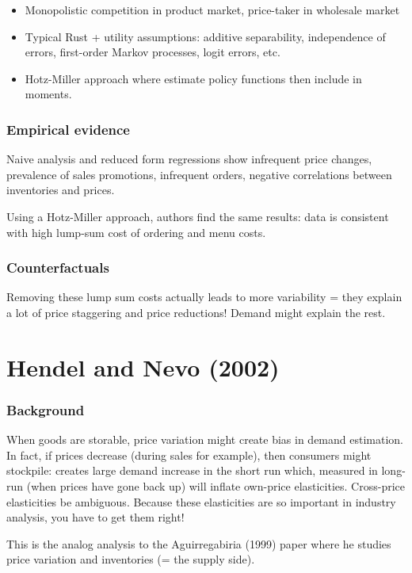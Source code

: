 \begin{itemize}
\item Monopolistic competition in product market, price-taker in wholesale market
\item Typical Rust + utility assumptions: additive separability, independence of errors, first-order Markov processes, logit errors, etc.
\item Hotz-Miller approach where estimate policy functions then include in moments.
\end{itemize}

\subsubsection{Empirical evidence}

Naive analysis and reduced form regressions show infrequent price changes, prevalence of sales promotions, infrequent orders, negative correlations between inventories and prices.

Using a Hotz-Miller approach, authors find the same results: data is consistent with high lump-sum cost of ordering and menu costs.

\subsubsection{Counterfactuals}

Removing these lump sum costs actually leads to more variability = they explain a lot of price staggering and price reductions! Demand might explain the rest.

\section{Hendel and Nevo (2002)}

\subsubsection{Background}

When goods are storable, price variation might create bias in demand estimation. In fact, if prices decrease (during sales for example), then consumers might stockpile: creates large demand increase in the short run which, measured in long-run (when prices have gone back up) will inflate own-price elasticities. Cross-price elasticities be ambiguous. Because these elasticities are so important in industry analysis, you have to get them right!

This is the analog analysis to the Aguirregabiria (1999) paper where he studies price variation and inventories (= the supply side).

